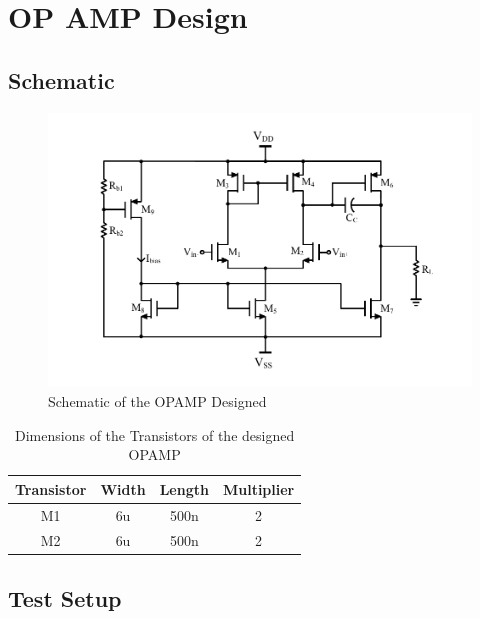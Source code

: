 \section{OP AMP Design}

\subsection{Schematic}
\begin{figure} [H]
\centering
\includegraphics[scale=1]{Figures/Schematics/OPAMP_Vbias.pdf}
\caption{Schematic of the OPAMP Designed}
\end{figure}

\begin{table} [H]
\centering
\begin{tabular}{@{}cccc@{}}
\toprule
Transistor			& Width				& Length			& Multiplier \\ \midrule
M1					& 6u				& 500n				&2			\\
M2					& 6u				& 500n				&2			\\ \bottomrule
\end{tabular}
\caption{Dimensions of the Transistors of the designed OPAMP}
\end{table}

\subsection{Test Setup}

